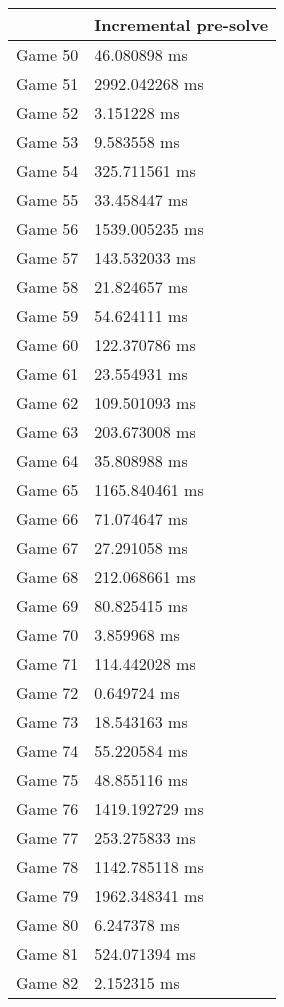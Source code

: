 \begin{tabular}{|l|l|}
	\hline
	& Incremental pre-solve \\ \hline
	Game 50 & 46.080898 ms \\ \hline
	Game 51 & 2992.042268 ms \\ \hline
	Game 52 & 3.151228 ms \\ \hline
	Game 53 & 9.583558 ms \\ \hline
	Game 54 & 325.711561 ms \\ \hline
	Game 55 & 33.458447 ms \\ \hline
	Game 56 & 1539.005235 ms \\ \hline
	Game 57 & 143.532033 ms \\ \hline
	Game 58 & 21.824657 ms \\ \hline
	Game 59 & 54.624111 ms \\ \hline
	Game 60 & 122.370786 ms \\ \hline
	Game 61 & 23.554931 ms \\ \hline
	Game 62 & 109.501093 ms \\ \hline
	Game 63 & 203.673008 ms \\ \hline
	Game 64 & 35.808988 ms \\ \hline
	Game 65 & 1165.840461 ms \\ \hline
	Game 66 & 71.074647 ms \\ \hline
	Game 67 & 27.291058 ms \\ \hline
	Game 68 & 212.068661 ms \\ \hline
	Game 69 & 80.825415 ms \\ \hline
	Game 70 & 3.859968 ms \\ \hline
	Game 71 & 114.442028 ms \\ \hline
	Game 72 & 0.649724 ms \\ \hline
	Game 73 & 18.543163 ms \\ \hline
	Game 74 & 55.220584 ms \\ \hline
	Game 75 & 48.855116 ms \\ \hline
	Game 76 & 1419.192729 ms \\ \hline
	Game 77 & 253.275833 ms \\ \hline
	Game 78 & 1142.785118 ms \\ \hline
	Game 79 & 1962.348341 ms \\ \hline
	Game 80 & 6.247378 ms \\ \hline
	Game 81 & 524.071394 ms \\ \hline
	Game 82 & 2.152315 ms \\ \hline

\end{tabular}
